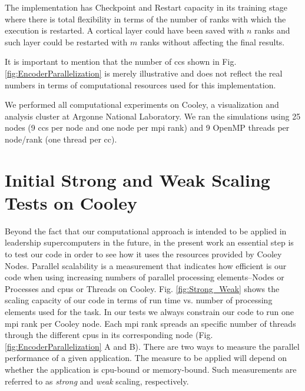 \documentclass{book}
\begin{document}
\begin{appendices}
The implementation has Checkpoint and Restart capacity in its training stage where there is total flexibility in terms of the number of ranks with which the execution is restarted. A cortical layer could have been saved with $n$ ranks and such layer could be restarted with $m$ ranks without affecting the final results.

It is important to mention that the number of \glspl{cc} shown in Fig. \ref{fig:EncoderParallelization} is merely illustrative and does not reflect the real numbers in terms of computational resources used for this implementation. 

We performed all computational experiments on Cooley, a visualization and analysis cluster at Argonne National Laboratory. We ran the simulations using 25 nodes (9 \glspl{cc} per node and one node per \gls{mpi} rank) and 9 OpenMP threads per node/rank (one thread per \gls{cc}).

\section{Initial Strong and Weak Scaling Tests on Cooley}

Beyond the fact that our computational approach is intended to be applied in leadership supercomputers in the future, in the present work an essential step is to test our code in order to see how it uses the resources provided by Cooley Nodes. Parallel scalability is a measurement that indicates how efficient is our code when using increasing numbers of parallel processing elements--Nodes or Processes and \glspl{cpu} or Threads on Cooley. Fig. \ref{fig:Strong_Weak} shows the scaling capacity of our code in terms of run time vs. number of processing elements used for the task. In our tests we always constrain our code to run one \gls{mpi} rank per Cooley node. Each \gls{mpi} rank spreads an specific number of threads through the different \glspl{cpu} in its corresponding node (Fig. \ref{fig:EncoderParallelization} A and B). There are two ways to measure the parallel performance of a given application. The measure to be applied will depend on whether the application is \gls{cpu}-bound or memory-bound. Such measurements are referred to as \emph{strong} and \emph{weak} scaling, respectively.


\end{appendices}
\end{document}
